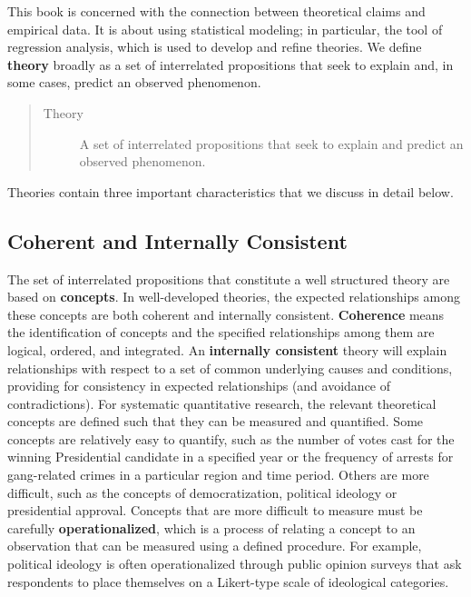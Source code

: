 \documentclass[11pt,openany]{book}\usepackage[]{graphicx}\usepackage[]{color}
\begin{document}
This book is concerned with the connection between theoretical claims and empirical data. It is about using statistical modeling; in particular, the tool of regression analysis, which is used to develop and refine theories. We define \textbf{theory} broadly as a set of interrelated propositions that seek to explain and, in some cases, predict an observed phenomenon. 
\begin{quote}
\begin{description}
\item[Theory] A set of interrelated propositions that seek to 
  explain and predict an observed phenomenon.
\end{description}
\end{quote}

\noindent Theories contain three important characteristics that we discuss in detail below. 

\begin{grbox}
\end{grbox}

\subsection{Coherent and Internally Consistent}

The set of interrelated propositions that constitute a well structured theory are based on \textbf{concepts}. In well-developed theories, the expected relationships among these concepts are both coherent and internally consistent. \textbf{Coherence} means the identification of concepts and the specified relationships among them are logical, ordered, and integrated. An \textbf{internally consistent} theory will explain relationships with respect to a set of common underlying causes and conditions, providing for consistency in expected relationships (and avoidance of contradictions). For systematic quantitative research, the relevant theoretical concepts are defined such that they can be measured and quantified. Some concepts are relatively easy to quantify, such as the number of votes cast for the winning Presidential candidate in a specified year or the frequency of arrests for gang-related crimes in a particular region and time period. Others are more difficult, such as the concepts of democratization, political ideology or presidential approval. Concepts that are more difficult to measure must be carefully \textbf{operationalized}, which is a process of relating a concept to an observation that can be measured using a defined procedure. For example, political ideology is often operationalized through public opinion surveys that ask respondents to place themselves on a Likert-type scale of ideological categories. 
\end{document}
